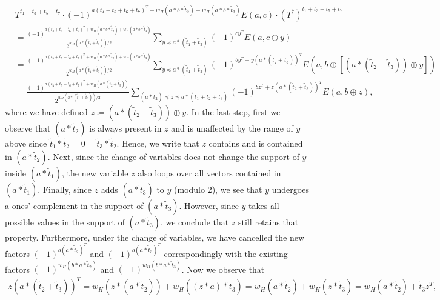 \documentclass[twoside,romanappendices]{IEEEtran}
\begin{document}
\begin{align}
& T^{t_1 + t_3 + t_5 + t_7} \cdot (-1)^{a (t_4 + t_5 + t_6 + t_7)^T + w_H(a \ast b \ast \tilde{t}_2) + w_H(a \ast b \ast \tilde{t}_3)} E(a,c) \cdot (T^{\dagger})^{t_1 + t_3 + t_5 + t_7} \nonumber \\    
%
  & = \frac{(-1)^{a (t_4 + t_5 + t_6 + t_7)^T + w_H(a \ast b \ast \tilde{t}_2) + w_H(a \ast b \ast \tilde{t}_3)}}{2^{w_H(a \ast (\tilde{t}_1 + \tilde{t}_3))/2}} \sum_{y \preceq a \ast (\tilde{t}_1 + \tilde{t}_3)} (-1)^{cy^T} E(a, c \oplus y) \\
%
  & = \frac{(-1)^{a (t_4 + t_5 + t_6 + t_7)^T + w_H(a \ast b \ast \tilde{t}_2) + w_H(a \ast b \ast \tilde{t}_3)}}{2^{w_H(a \ast (\tilde{t}_1 + \tilde{t}_3))/2}} \sum_{y \preceq a \ast (\tilde{t}_1 + \tilde{t}_3)} (-1)^{by^T + y (a \ast (\tilde{t}_2 + \tilde{t}_3))^T} E(a, b \oplus [(a \ast (\tilde{t}_2 + \tilde{t}_3)) \oplus y]) \\
%
  & = \frac{(-1)^{a (t_4 + t_5 + t_6 + t_7)^T + w_H(a \ast (\tilde{t}_2 + \tilde{t}_3)) }}{2^{w_H(a \ast (\tilde{t}_1 + \tilde{t}_3))/2}} \sum_{(a \ast \tilde{t}_2) \preceq z \preceq a \ast (\tilde{t}_1 + \tilde{t}_2 + \tilde{t}_3)} (-1)^{bz^T + z (a \ast (\tilde{t}_2 + \tilde{t}_3))^T} E(a, b \oplus z),
\end{align}
where we have defined $z \coloneqq (a \ast (\tilde{t}_2 + \tilde{t}_3)) \oplus y$.
In the last step, first we observe that $(a \ast \tilde{t}_2)$ is always present in $z$ and is unaffected by the range of $y$ above since $\tilde{t}_1 \ast \tilde{t}_2 = 0 = \tilde{t}_3 \ast \tilde{t}_2$.
Hence, we write that $z$ contains and is contained in $(a \ast \tilde{t}_2)$.
Next, since the change of variables does not change the support of $y$ inside $(a \ast \tilde{t}_1)$, the new variable $z$ also loops over all vectors contained in $(a \ast \tilde{t}_1)$.
Finally, since $z$ adds $(a \ast \tilde{t}_3)$ to $y$ (modulo 2), we see that $y$ undergoes a ones' complement in the support of $(a \ast \tilde{t}_3)$.
However, since $y$ takes all possible values in the support of $(a \ast \tilde{t}_3)$, we conclude that $z$ still retains that property.
Furthermore, under the change of variables, we have cancelled the new factors $(-1)^{b (a \ast \tilde{t}_2)^T}$ and $(-1)^{b (a \ast \tilde{t}_3)^T}$ correspondingly with the existing factors $(-1)^{w_H(b \ast a \ast \tilde{t}_2)}$ and $(-1)^{w_H(b \ast a \ast \tilde{t}_3)}$.
Now we observe that 
\begin{align}
z (a \ast (\tilde{t}_2 + \tilde{t}_3))^T = w_H(z \ast (a \ast \tilde{t}_2)) + w_H((z \ast a) \ast \tilde{t}_3) = w_H(a \ast \tilde{t}_2) + w_H(z \ast \tilde{t}_3) = w_H(a \ast \tilde{t}_2) + \tilde{t}_3 z^T,
\end{align}
\end{document}
